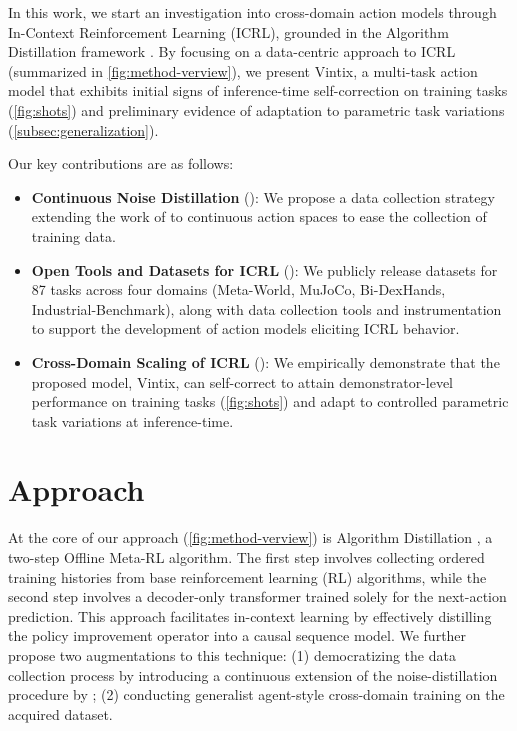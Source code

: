 \documentclass{article}
\theoremstyle{plain}
\theoremstyle{definition}
\theoremstyle{remark}
\begin{document}
In this work, we start an investigation into cross-domain action models through In-Context Reinforcement Learning (ICRL), grounded in the Algorithm Distillation framework \cite{laskin2022incontextreinforcementlearningalgorithm}. By focusing on a data-centric approach to ICRL (summarized in \cref{fig:method-verview}), we present Vintix, a multi-task action model that exhibits initial signs of inference-time self-correction on training tasks (\cref{fig:shots}) and preliminary evidence of adaptation to parametric task variations (\cref{subsec:generalization}).

Our key contributions are as follows:
\begin{itemize}
    \item \textbf{Continuous Noise Distillation} (): We propose a data collection strategy extending the work of \citet{zisman2024emergenceincontextreinforcementlearning} to continuous action spaces to ease the collection of training data.
    \item \textbf{Open Tools and Datasets for ICRL} (): We publicly release datasets for 87 tasks across four domains (Meta-World, MuJoCo, Bi-DexHands, Industrial-Benchmark), along with data collection tools and instrumentation to support the development of action models eliciting ICRL behavior.
    \item \textbf{Cross-Domain Scaling of ICRL} (): We empirically demonstrate that the proposed model, Vintix, can self-correct to attain demonstrator-level performance on training tasks (\cref{fig:shots}) and adapt to controlled parametric task variations at inference-time.
\end{itemize}

\section{Approach}

At the core of our approach (\cref{fig:method-verview}) is Algorithm Distillation \cite{laskin2022incontextreinforcementlearningalgorithm}, a two-step Offline Meta-RL algorithm. The first step involves collecting ordered training histories from base reinforcement learning (RL) algorithms, while the second step involves a decoder-only transformer trained solely for the next-action prediction. This approach facilitates in-context learning by effectively distilling the policy improvement operator into a causal sequence model. We further propose two augmentations to this technique: (1) democratizing the data collection process by introducing a continuous extension of the noise-distillation procedure by \citet{zisman2024emergenceincontextreinforcementlearning}; (2) conducting generalist agent-style cross-domain training on the acquired dataset.
\end{document}
